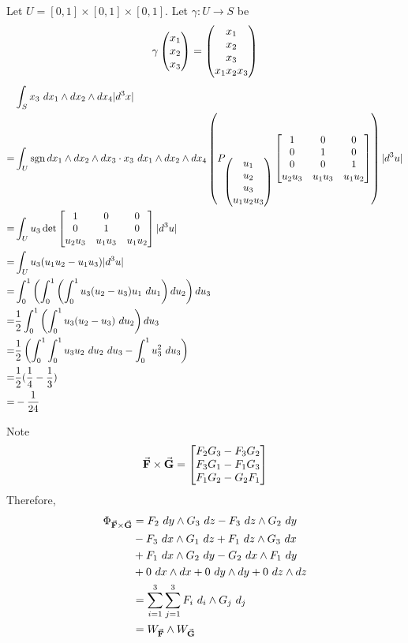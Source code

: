 \documentclass{homework}
\DeclareMathOperator{\sgn}{sgn}
\begin{document}
\begin{problem}{2}
  Let $U = [0, 1] \times [0, 1] \times [0, 1]$.
  Let $\gamma: U \to S$ be
  $$\gamma\begin{pmatrix}x_1 \\ x_2 \\ x_3\end{pmatrix} = \begin{pmatrix}x_1 \\ x_2 \\ x_3 \\ x_1x_2x_3\end{pmatrix}$$
  \begin{align*} &
    \int_S x_3\ dx_1 \land dx_2 \land dx_4 |d^3x| \\ =&
    \int_U
      \sgn dx_1 \land dx_2 \land dx_3 \cdot
      x_3\ dx_1 \land dx_2 \land dx_4 \left(
      P_{\pmat{u_1 \\ u_2 \\ u_3 \\ u_1u_2u_3}}
        \bmat{
          1      & 0      & 0 \\
          0      & 1      & 0 \\
          0      & 0      & 1 \\
          u_2u_3 & u_1u_3 & u_1u_2
        }\right)
      |d^3u| \\ =&
    \int_U u_3\det\bmat{
      1      & 0      & 0 \\
      0      & 1      & 0 \\
      u_2u_3 & u_1u_3 & u_1u_2}
      |d^3u| \\ =&
    \int_U u_3(u_1u_2 - u_1u_3) |d^3u| \\ =&
    \int_0^1 \left(
      \int_0^1 \left(
        \int_0^1 u_3(u_2-u_3)u_1\ du_1
        \right) du_2
      \right) du_3 \\ =&
    \dfrac{1}{2}
    \int_0^1 \left( \int_0^1 u_3(u_2 - u_3)\ du_2 \right) du_3 \\ =&
    \dfrac{1}{2} \left(
      \int_0^1\int_0^1 u_3u_2\ du_2\ du_3 -
      \int_0^1 u_3^2\ du_3
    \right) \\ =&
    \dfrac{1}{2}(\dfrac{1}{4} - \dfrac{1}{3}) \\ =&
    -\dfrac{1}{24}
  \end{align*}
\end{problem}

\begin{problem}{3}
  Note
  $$\vec{\mathbf{F}} \times \vec{\mathbf{G}} = \begin{bmatrix}
    F_2G_3 - F_3G_2 \\
    F_3G_1 - F_1G_3 \\
    F_1G_2 - G_2F_1
  \end{bmatrix}$$
  Therefore,
  \begin{align*}
    \Phi_{\vec{\mathbf{F}} \times \vec{\mathbf{G}}} &=
    F_2\ dy\land G_3\ dz - F_3\ dz\land G_2\ dy \\ &-
    F_3\ dx\land G_1\ dz + F_1\ dz\land G_3\ dx \\ &+
    F_1\ dx\land G_2\ dy - G_2\ dx\land F_1\ dy \\ &+
    0\ dx \land dx + 0\ dy \land dy + 0\ dz \land dz  \\ &=
    \sum_{i=1}^3\sum_{j=1}^3 F_i\ d_i\land G_j\ d_j \\ &=
    W_{\vec{\mathbf{F}}} \land W_{\vec{\mathbf{G}}}
  \end{align*}
  \QED
\end{problem}
\end{document}
